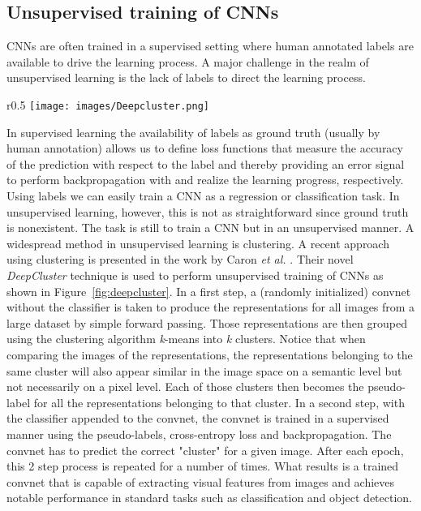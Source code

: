 \documentclass[a4paper,12pt]{report}
\begin{document}
\subsection{Unsupervised training of CNNs}\label{subsec:deepcluster}
CNNs are often trained in a supervised setting where human annotated labels are available to drive the learning process. A major challenge in the realm of unsupervised learning is the lack of labels to direct the learning process. 
\begin{wrapfigure}{r}{0.5\textwidth}
\texttt{[image: images/Deepcluster.png]} 
\caption{DeepCluster unsupervised training of CNNs \cite{DeepCluster}.}
\label{fig:deepcluster}
\end{wrapfigure}
In supervised learning the availability of labels as ground truth (usually by human annotation) allows us to define loss functions that measure the accuracy of the prediction with respect to the label and thereby providing an error signal to perform backpropagation with and realize the learning progress, respectively. Using labels we can easily train a CNN as a regression or classification task. In unsupervised learning, however, this is not as straightforward since ground truth is nonexistent. The task is still to train a CNN but in an unsupervised manner. A widespread method in unsupervised learning is clustering. A recent approach using clustering is presented in the work by Caron \textit{et al.} \cite{DeepCluster}. Their novel \textit{DeepCluster} technique is used to perform unsupervised training of CNNs as shown in Figure~\ref{fig:deepcluster}. In a first step, a (randomly initialized) convnet without the classifier is taken to produce the representations for all images from a large dataset by simple forward passing. Those representations are then grouped using the clustering algorithm \textit{k}-means into \textit{k} clusters. Notice that when comparing the images of the representations, the representations belonging to the same cluster will also appear similar in the image space on a semantic level but not necessarily on a pixel level. Each of those clusters then becomes the pseudo-label for all the representations belonging to that cluster. In a second step, with the classifier appended to the convnet, the convnet is trained in a supervised manner using the pseudo-labels, cross-entropy loss and backpropagation. The convnet has to predict the correct "cluster" for a given image. After each epoch, this 2 step process is repeated for a number of times. What results is a trained convnet that is capable of extracting visual features from images and achieves notable performance in standard tasks such as classification and object detection.
\end{document}

